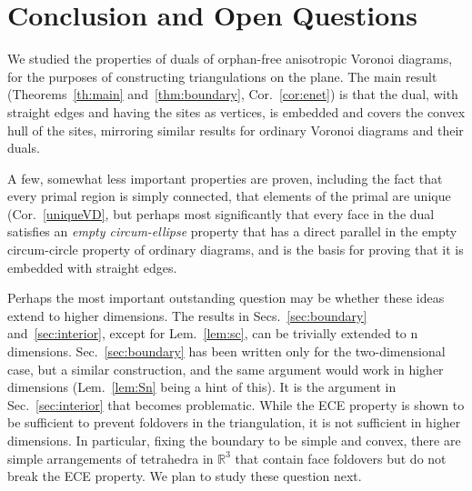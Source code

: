 \documentclass[11pt]{article}
\begin{document}
\section{Conclusion and Open Questions}

We studied the properties of duals of orphan-free anisotropic Voronoi diagrams, for the
purposes of constructing triangulations on the plane. 
The main result (Theorems~\ref{th:main} and~\ref{thm:boundary}, Cor.~\ref{cor:enet}) is that
the dual, with straight edges and having the sites as vertices, is embedded
and covers the convex hull of the sites, mirroring similar results for
ordinary Voronoi diagrams and their duals. 

A few, somewhat less important  properties are proven, including the fact
that every primal region is simply connected, that elements of the primal are unique (Cor.~\ref{uniqueVD}, 
but perhaps most significantly
that every face in the dual satisfies an \emph{empty circum-ellipse}
property that has a direct parallel in the empty circum-circle property of
ordinary diagrams, and is the basis for proving that it is embedded with
straight edges. 

Perhaps the most important outstanding question may be whether these ideas
extend to higher dimensions. The results in Secs.~\ref{sec:boundary} and~\ref{sec:interior},
except for Lem.~\ref{lem:sc}, can be trivially extended to n dimensions. 
Sec.~\ref{sec:boundary} has been written only for the two-dimensional case,
but a similar construction, and the same argument would work in higher
dimensions (Lem.~\ref{lem:Sn} being a hint of this). 
It is the argument in Sec.~\ref{sec:interior} that becomes problematic. 
While the ECE property is shown to be sufficient to prevent foldovers in the
triangulation, it is not sufficient in 
higher dimensions. In particular, fixing the boundary to be simple and convex, 
there are simple arrangements of tetrahedra in $\mathbb{R}^3$ that contain 
face foldovers but do not break the ECE property. 
We plan to study these question next. 













\newpage


\end{document}
